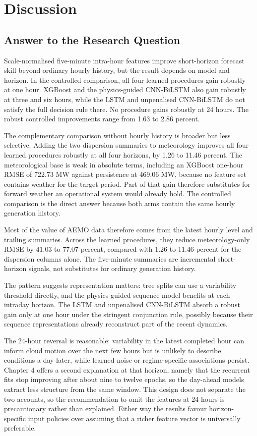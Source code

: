 \section{Discussion}

\subsection{Answer to the Research Question}

Scale-normalised five-minute intra-hour features improve short-horizon forecast skill beyond ordinary hourly history, but the result depends on model and horizon. In the controlled comparison, all four learned procedures gain robustly at one hour. XGBoost and the physics-guided CNN-\allowbreak{}BiLSTM also gain robustly at three and six hours, while the LSTM and unpenalised CNN-\allowbreak{}BiLSTM do not satisfy the full decision rule there. No procedure gains robustly at 24 hours. The robust controlled improvements range from 1.63 to 2.86 percent.

The complementary comparison without hourly history is broader but less selective. Adding the two dispersion summaries to meteorology improves all four learned procedures robustly at all four horizons, by 1.26 to 11.46 percent. The meteorological base is weak in absolute terms, including an XGBoost one-hour RMSE of 722.73 MW against persistence at 469.06 MW, because no feature set contains weather for the target period. Part of that gain therefore substitutes for forward weather an operational system would already hold. The controlled comparison is the direct answer because both arms contain the same hourly generation history.

Most of the value of AEMO data therefore comes from the latest hourly level and trailing summaries. Across the learned procedures, they reduce meteorology-only RMSE by 41.03 to 77.07 percent, compared with 1.26 to 11.46 percent for the dispersion columns alone. The five-minute summaries are incremental short-horizon signals, not substitutes for ordinary generation history.

The pattern suggests representation matters: tree splits can use a variability threshold directly, and the physics-guided sequence model benefits at each intraday horizon. The LSTM and unpenalised CNN-\allowbreak{}BiLSTM absorb a robust gain only at one hour under the stringent conjunction rule, possibly because their sequence representations already reconstruct part of the recent dynamics.

The 24-hour reversal is reasonable: variability in the latest completed hour can inform cloud motion over the next few hours but is unlikely to describe conditions a day later, while learned noise or regime-specific associations persist. Chapter 4 offers a second explanation at that horizon, namely that the recurrent fits stop improving after about nine to twelve epochs, so the day-ahead models extract less structure from the same window. This design does not separate the two accounts, so the recommendation to omit the features at 24 hours is precautionary rather than explained. Either way the results favour horizon-specific input policies over assuming that a richer feature vector is universally preferable.

